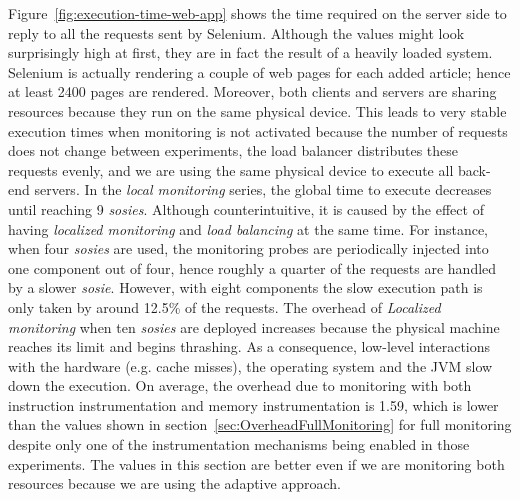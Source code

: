 Figure~\ref{fig:execution-time-web-app} shows the time required on the server side to reply to all the requests sent by Selenium.
Although the values might look surprisingly high at first, they are in fact the result of a heavily loaded system.
Selenium is actually rendering a couple of web pages for each added article; hence at least 2400 pages are rendered.
Moreover, both clients and servers are sharing resources because they run on the same physical device.
This leads to very stable execution times when monitoring is not activated because the number of requests does not change between experiments, the load balancer distributes these requests evenly, and we are using the same physical device to execute all back-end servers.
In the \textit{local monitoring} series, the global time to execute decreases until reaching 9 \textit{sosies}.
Although counterintuitive, it is caused by the effect of having \textit{localized monitoring} and \textit{load balancing} at the same time.
For instance, when four \textit{sosies} are used, the monitoring probes are periodically injected into one component out of four, hence roughly a quarter of the requests are handled by a slower \textit{sosie}.
However, with eight components the slow execution path is only taken by around 12.5\% of the requests.
The overhead of \textit{Localized monitoring} when ten \textit{sosies} are deployed increases because the physical machine reaches its limit and begins thrashing.
As a consequence, low-level interactions with the hardware (e.g. cache misses), the operating system and the JVM slow down the execution.
On average, the overhead due to monitoring with both instruction instrumentation and memory instrumentation is 1.59, which is lower than the values shown in section~\ref{sec:OverheadFullMonitoring} for full monitoring despite only one of the instrumentation mechanisms being enabled in those experiments.
The values in this section are better even if we are monitoring both resources because we are using the adaptive approach.
   

